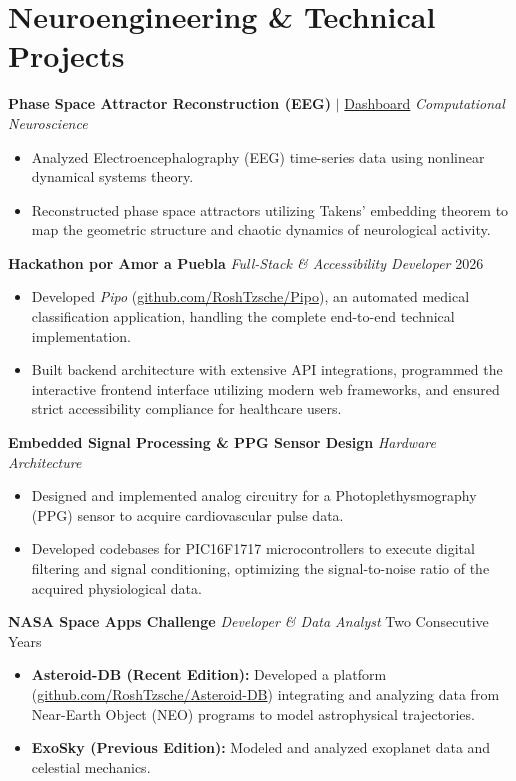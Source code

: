 \documentclass[10pt,letterpaper]{article}
\begin{document}
\section{Neuroengineering \& Technical Projects}

\textbf{Phase Space Attractor Reconstruction (EEG)} $|$ \href{https://github.com/RoshTzsche/signals_attractor}{Dashboard} \hfill \textit{Computational Neuroscience}
\begin{itemize}
    \item Analyzed Electroencephalography (EEG) time-series data using nonlinear dynamical systems theory.
    \item Reconstructed phase space attractors utilizing Takens' embedding theorem to map the geometric structure and chaotic dynamics of neurological activity.
\end{itemize}

\textbf{Hackathon por Amor a Puebla} \hfill \textit{Full-Stack \& Accessibility Developer} \hfill 2026
\begin{itemize}
    \item Developed \textit{Pipo} (\href{https://github.com/RoshTzsche/Pipo}{github.com/RoshTzsche/Pipo}), an automated medical classification application, handling the complete end-to-end technical implementation.
    \item Built backend architecture with extensive API integrations, programmed the interactive frontend interface utilizing modern web frameworks, and ensured strict accessibility compliance for healthcare users.
\end{itemize}

\textbf{Embedded Signal Processing \& PPG Sensor Design} \hfill \textit{Hardware Architecture}
\begin{itemize}
    \item Designed and implemented analog circuitry for a Photoplethysmography (PPG) sensor to acquire cardiovascular pulse data.
    \item Developed codebases for PIC16F1717 microcontrollers to execute digital filtering and signal conditioning, optimizing the signal-to-noise ratio of the acquired physiological data.
\end{itemize}

\textbf{NASA Space Apps Challenge} \hfill \textit{Developer \& Data Analyst} \hfill Two Consecutive Years
\begin{itemize}
    \item \textbf{Asteroid-DB (Recent Edition):} Developed a platform (\href{https://github.com/RoshTzsche/Asteroid-DB}{github.com/RoshTzsche/Asteroid-DB}) integrating and analyzing data from Near-Earth Object (NEO) programs to model astrophysical trajectories.
    \item \textbf{ExoSky (Previous Edition):} Modeled and analyzed exoplanet data and celestial mechanics.
\end{itemize}
\end{document}

